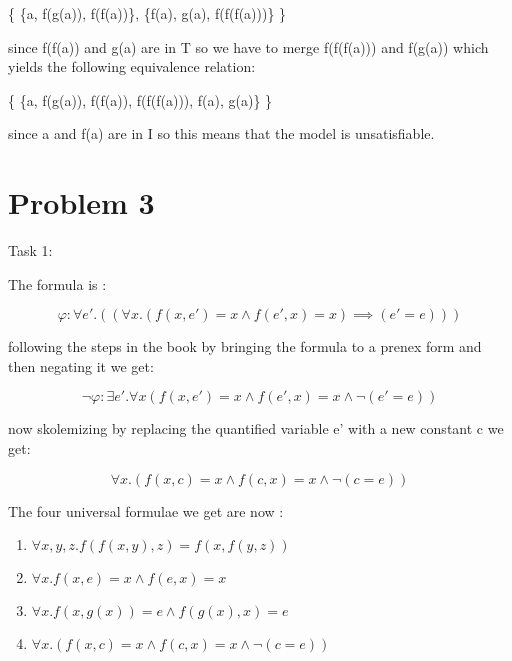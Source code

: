 \documentclass[12pt]{article}
\begin{document}
\{ \{a, f(g(a)), f(f(a))\}, \{f(a), g(a), f(f(f(a)))\} \}

since f(f(a)) and g(a) are in T so we have to merge f(f(f(a))) and f(g(a)) which yields the following equivalence relation:

\{ \{a, f(g(a)), f(f(a)), f(f(f(a))), f(a), g(a)\} \}

since a and f(a)  are in I so this means that the model is unsatisfiable.


\section*{Problem 3}
\noindent Task 1:

The formula is :

\begin {equation}
\varphi : \forall e'. ((\forall x. (f(x,e') = x \land f(e',x) = x) \implies (e' = e)))
\end{equation}

following the steps in the book by bringing the formula to a prenex form and then negating it we get:

\begin {equation}
\neg \varphi: \exists e'. \forall x (f(x,e') = x \land f(e',x) = x \land \neg (e' = e))
\end{equation}

now skolemizing by replacing the quantified variable e' with a new constant c we get:

\begin {equation}
\forall x. (f(x,c) = x \land f(c,x) = x \land \neg (c = e))
\end {equation}

The four universal formulae we get are now :
\begin{enumerate}
    \item $\forall x,y,z. f(f(x,y),z) = f(x,f(y,z))$
   
    \item $\forall x. f(x,e) = x \land f(e,x) = x$

    \item $\forall x. f(x , g(x)) = e \land f(g(x),x) = e$

    \item $\forall x. (f(x,c) = x \land f(c,x) = x \land \neg (c = e))$
\end{enumerate}
\end{document}
